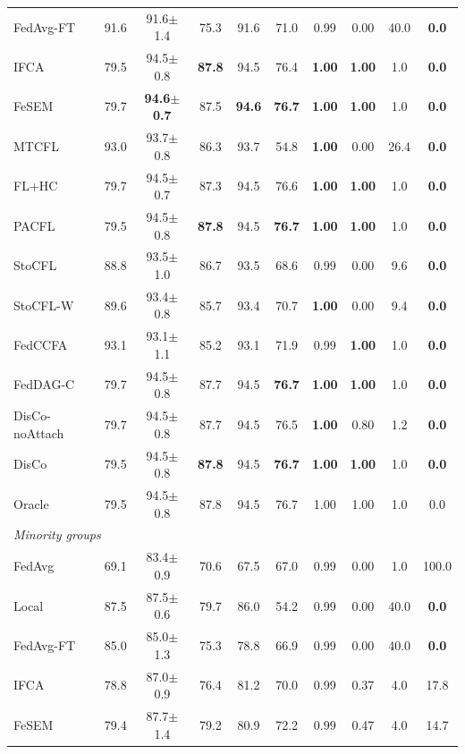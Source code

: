 \begin{tabular}{lccccccccc}
FedAvg-FT & 91.6 & 91.6$\pm$1.4 & 75.3 & 91.6 & 71.0 & 0.99 & 0.00 & 40.0 & \textbf{0.0} \\
IFCA & 79.5 & 94.5$\pm$0.8 & \textbf{87.8} & 94.5 & 76.4 & \textbf{1.00} & \textbf{1.00} & 1.0 & \textbf{0.0} \\
FeSEM & 79.7 & \textbf{94.6$\pm$0.7} & 87.5 & \textbf{94.6} & \textbf{76.7} & \textbf{1.00} & \textbf{1.00} & 1.0 & \textbf{0.0} \\
MTCFL & 93.0 & 93.7$\pm$0.8 & 86.3 & 93.7 & 54.8 & \textbf{1.00} & 0.00 & 26.4 & \textbf{0.0} \\
FL+HC & 79.7 & 94.5$\pm$0.7 & 87.3 & 94.5 & 76.6 & \textbf{1.00} & \textbf{1.00} & 1.0 & \textbf{0.0} \\
PACFL & 79.5 & 94.5$\pm$0.8 & \textbf{87.8} & 94.5 & \textbf{76.7} & \textbf{1.00} & \textbf{1.00} & 1.0 & \textbf{0.0} \\
StoCFL & 88.8 & 93.5$\pm$1.0 & 86.7 & 93.5 & 68.6 & 0.99 & 0.00 & 9.6 & \textbf{0.0} \\
StoCFL-W & 89.6 & 93.4$\pm$0.8 & 85.7 & 93.4 & 70.7 & \textbf{1.00} & 0.00 & 9.4 & \textbf{0.0} \\
FedCCFA & 93.1 & 93.1$\pm$1.1 & 85.2 & 93.1 & 71.9 & 0.99 & \textbf{1.00} & 1.0 & \textbf{0.0} \\
FedDAG-C & 79.7 & 94.5$\pm$0.8 & 87.7 & 94.5 & \textbf{76.7} & \textbf{1.00} & \textbf{1.00} & 1.0 & \textbf{0.0} \\
DisCo-noAttach & 79.7 & 94.5$\pm$0.8 & 87.7 & 94.5 & 76.5 & \textbf{1.00} & 0.80 & 1.2 & \textbf{0.0} \\
DisCo & 79.5 & 94.5$\pm$0.8 & \textbf{87.8} & 94.5 & \textbf{76.7} & \textbf{1.00} & \textbf{1.00} & 1.0 & \textbf{0.0} \\
Oracle & 79.5 & 94.5$\pm$0.8 & 87.8 & 94.5 & 76.7 & 1.00 & 1.00 & 1.0 & 0.0 \\
\midrule
\multicolumn{10}{l}{\textit{Minority groups}}\\
FedAvg & 69.1 & 83.4$\pm$0.9 & 70.6 & 67.5 & 67.0 & 0.99 & 0.00 & 1.0 & 100.0 \\
Local & 87.5 & 87.5$\pm$0.6 & 79.7 & 86.0 & 54.2 & 0.99 & 0.00 & 40.0 & \textbf{0.0} \\
FedAvg-FT & 85.0 & 85.0$\pm$1.3 & 75.3 & 78.8 & 66.9 & 0.99 & 0.00 & 40.0 & \textbf{0.0} \\
IFCA & 78.8 & 87.0$\pm$0.9 & 76.4 & 81.2 & 70.0 & 0.99 & 0.37 & 4.0 & 17.8 \\
FeSEM & 79.4 & 87.7$\pm$1.4 & 79.2 & 80.9 & 72.2 & 0.99 & 0.47 & 4.0 & 14.7 \\

\end{tabular}
